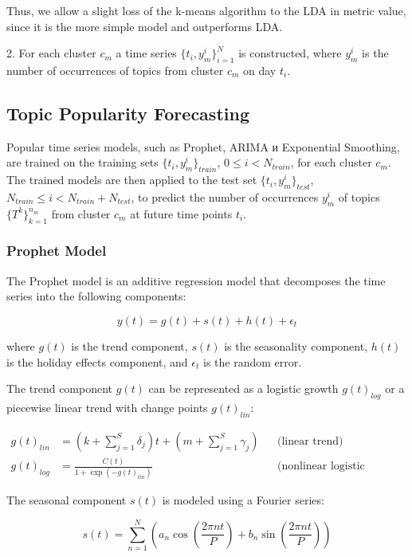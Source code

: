 Thus, we allow a slight loss of the k-means algorithm to the LDA in metric value, since it is the more simple model and outperforms LDA.



2. For each cluster  $c_m$ a time series $\{t_i, y_m^i\}_{i=1}^N$ is constructed, where $y_m^i$ is the number of occurrences of topics from cluster $c_m$ on day  $t_i$.

\subsection{Topic Popularity Forecasting}

Popular time series models, such as Prophet, ARIMA и Exponential Smoothing, are trained on the training sets $\{t_i, y_m^i\}_{train}$, $0 \leq i < N_{train}$, for each cluster $c_m$. The trained models are then applied to the test set $\{t_i, y_m^i\}_{test}$, $N_{train} \leq i < N_{train} + N_{test}$, to predict the number of occurrences $y_m^i$ of topics $\{T^k\}_{k=1}^{n_m}$ from cluster  $c_m$ at future time points $t_i$.

\subsubsection{Prophet Model}

The Prophet model is an additive regression model that decomposes the time series into the following components:

\begin{equation}
y(t) = g(t) + s(t) + h(t) + \epsilon_t
\end{equation}

where $g(t)$ is the trend component, $s(t)$ is the seasonality component, $h(t)$ is the holiday effects component, and $\epsilon_t$ is the random error.

The trend component  $g(t)$ can be represented as a logistic growth $g(t)_{log}$ or a piecewise linear trend with change points $g(t)_{lin}$:


\begin{align}
g(t)_{lin} &= (k + \sum_{j=1}^S \delta_j)t + (m + \sum_{j=1}^S \gamma_j) &&\text{(linear trend)} \\
g(t)_{log} &= \frac{C(t)}{1 + \exp{(-g(t)_{lin})}} &&\text{(nonlinear logistic growth)}
\end{align}

The seasonal component $s(t)$ is modeled using a Fourier series:


\begin{equation}
s(t) = \sum_{n=1}^N \left(a_n \cos\left(\frac{2\pi n t}{P}\right) + b_n \sin\left(\frac{2\pi n t}{P}\right)\right)
\end{equation}

